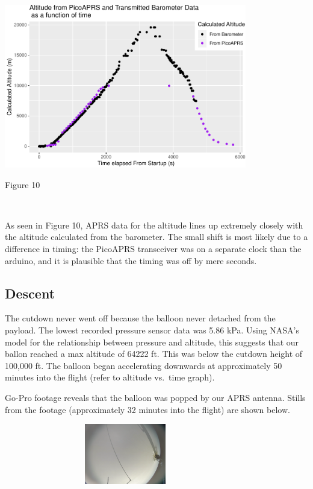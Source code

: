 \documentclass[12pt,]{article}
\begin{document}
\begin{center}\includegraphics[width=400px]{paper_files/figure-latex/altitude"-1} \end{center}

Figure 10

~

As seen in Figure 10, APRS data for the altitude lines up extremely
closely with the altitude calculated from the barometer. The small shift
is most likely due to a difference in timing: the PicoAPRS transceiver
was on a separate clock than the arduino, and it is plausible that the
timing was off by mere seconds.

\subsection{Descent}\label{descent}

The cutdown never went off because the balloon never detached from the
payload. The lowest recorded pressure sensor data was 5.86 kPa. Using
NASA's model for the relationship between pressure and altitude, this
suggests that our ballon reached a max altitude of 64222 ft. This was
below the cutdown height of 100,000 ft. The balloon began accelerating
downwards at approximately 50 minutes into the flight (refer to altitude
vs.~time graph).

Go-Pro footage reveals that the balloon was popped by our APRS antenna.
Stills from the footage (approximately 32 minutes into the flight) are
shown below.

\begin{center}\includegraphics[width=400px,height=100px]{assets/IMAGEBREAKA} \end{center}
\end{document}

